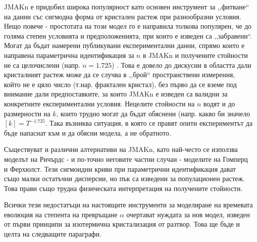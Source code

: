 
JMAKn е придобил широка популярност като основен инструмент за ,,фитване`` на данни със сигмодна форма от кристален растеж при разнообразни условия. Нещо повече - простотата на този модел го е направила толкова популярен, че до голяма степен условията и предположенията, при които е изведен са ,,забравени``. Могат да бъдат намерени публикувани експериментални данни, спрямо които е направена параметрична идентификация за $n$ в JMAKn и получените стойности не са целочислени (напр. $n = 1.725$) \cite{Min2005}. Това е довело до дискусии в областта дали кристалният растеж може да се случва в ,,брой`` пространствени измерения, който не е цяло число (т.нар. фрактален кристал), без първо да се вземе под внимание дали предпоставките, за които JMAKn е изведен са валидни за конкретните експериментални условия. Нецелите стойности на $n$ водят и до размерности на $k$, които трудно могат да бъдат обяснени (напр. какво би значело $[k]=T^{-1.725}$. Така възниква ситуация, в която се правят опити експериментът да бъде напаснат към и да обясни модела, а не обратното.

Съществуват и различни алтернативи на JMAKn, като най-често се използва моделът на Ричърдс - и по-точно неговите частни случаи - моделите на Гомперц и Ферхюлст. Тези сигмоидни криви при параметрични идентификация дават също малки остатъчни дисперсии, но пък са изведени за популационен растеж. Това прави също трудна физическата интерпретация на получените стойности.

Всички тези недостатъци на настоящите инструменти за моделиране на времевата еволюция на степента на превръщане $\alpha$ очертават нуждата за нов модел, изведен от първи принципи за изотермична кристализация от разтвор. Това ще бъде и целта на следващите параграфи.
